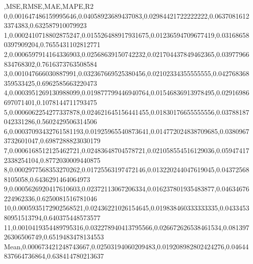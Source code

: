 ,MSE,RMSE,MAE,MAPE,R2
0,0.001647486159995646,0.04058923689437083,0.02984421722222222,0.06370816123374383,0.632587910079923
1,0.0002410718802875247,0.015526488917931675,0.01236594709677419,0.031686580397909204,0.7655431102812771
2,0.0006597914164336903,0.02568639150742232,0.021704437849462365,0.03977966834768302,0.7616373763508584
3,0.001047666030887991,0.032367669525380456,0.02102334355555555,0.042768368359533425,0.6962585663220473
4,0.0003951269130988099,0.019877799446940764,0.01546836913978495,0.02916986697071401,0.1078144711793475
5,0.0006062254277337878,0.024621645156441455,0.01830176655555556,0.03788187042331286,0.5602429506314506
6,0.00037093432761581193,0.01925965540873641,0.014772024838709685,0.03809673732601047,0.6987288823030179
7,0.0006168512125462721,0.02483648704578721,0.021058554516129036,0.059474172338254104,0.8772030009440875
8,0.0002977568353270262,0.01725563197472146,0.013220244047619045,0.043725688105058,0.6436291464064973
9,0.0005626920417610603,0.02372113067206334,0.016237801935483877,0.04634676224962336,0.6250081516781046
10,0.0005935172902568521,0.02436221026154645,0.019838460333333335,0.043345380951513794,0.640375448573577
11,0.0010419354489795316,0.032278940413795566,0.026672626538461534,0.08139726306506749,0.6519483478134553
Mean,0.000673421248743667,0.02503194060209483,0.019208982802424276,0.04644837664736864,0.638414780213637

